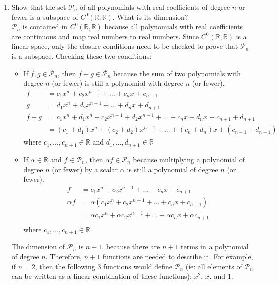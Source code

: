 \documentclass[11pt]{amsart}
\theoremstyle{plain}
\theoremstyle{definition}
\begin{document}
\begin{enumerate}
\bigskip

\item
Show that the set $\mathcal{P}_n$ of all polynomials with real coefficients
of degree $n$ or fewer is a subspace of $C^0(\mathbb{R},\mathbb{R})$. 
What is its dimension?  \\

$\mathcal{P}_n$ is contained in $C^0(\mathbb{R},\mathbb{R})$ because all polynomials with real coefficients are continuous and map real numbers to real numbers. Since $C^0(\mathbb{R},\mathbb{R})$ is a linear space, only the closure conditions need to be checked to prove that $\mathcal{P}_n$ is a subspace. Checking these two conditions:
\begin{itemize}
	\item If $f, g \in \mathcal{P}_n$, then $f + g \in \mathcal{P}_n$ because the sum of two polynomials with degree $n$ (or fewer) is still a polynomial with degree $n$ (or fewer).
	\begin{align} \nonumber
	f &= c_1 x^n + c_2 x^{n - 1} + ... + c_n x + c_{n+1} \\ \nonumber
	g &= d_1 x^n + d_2 x^{n - 1} + ... + d_n x + d_{n+1} \\ \nonumber
	f + g &= c_1 x^n + d_1 x^n + c_2 x^{n - 1} + d_2 x^{n - 1} + ... + c_n x + d_n x + c_{n+1} +  d_{n+1} \\ \nonumber
		  &= (c_1 + d_1)x^n + (c_2 + d_2)x^{n - 1} + ... + (c_n + d_n)x + (c_{n + 1} + d_{n + 1})
	\end{align}
	where $c_1, ... , c_{n+1} \in \mathbb{R}$ and $d_1, ... , d_{n+1} \in \mathbb{R}$ \\
	\item If $\alpha \in \mathbb{R}$ and $f \in \mathcal{P}_n$, then $\alpha f \in \mathcal{P}_n$ because multiplying a 	polynomial of degree $n$ (or fewer) by a scalar $\alpha$ is still a polynomial of degree $n$ (or fewer). 
	\begin{align} \nonumber
	f &= c_1 x^n + c_2 x^{n - 1} + ... + c_n x + c_{n+1} \\ \nonumber
	\alpha f &= \alpha (c_1 x^n + c_2 x^{n - 1} + ... + c_n x + c_{n+1}) \\ \nonumber
			  &= \alpha c_1 x^n + \alpha c_2 x^{n - 1} + ... + \alpha c_n x + \alpha c_{n+1} \\ \nonumber	
	\end{align}
	where $c_1, ... , c_{n+1} \in \mathbb{R}$. \\
\end{itemize}
The dimension of $\mathcal{P}_n$ is $n + 1$, because there are $n + 1$ terms in a polynomial of degree $n$. Therefore, $n + 1$ functions are needed to describe it. For example, if $n = 2$, then the following 3 functions would define $\mathcal{P}_n$ (ie: all elements of $\mathcal{P}_n$ can be written as a linear combination of these functions): $x^2$, $x$, and $1$.
\bigskip



\end{enumerate}
\end{document}
